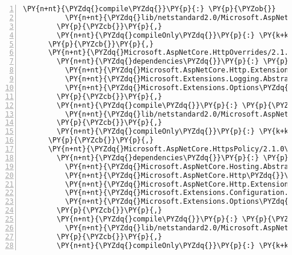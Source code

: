 \begin{Verbatim}[commandchars=\\\{\},numbers=left,firstnumber=1,stepnumber=1,numberblanklines=0]
        \PY{n+nt}{\PYZdq{}compile\PYZdq{}}\PY{p}{:} \PY{p}{\PYZob{}}
          \PY{n+nt}{\PYZdq{}lib/netstandard2.0/Microsoft.AspNetCore.Http.Features.dll\PYZdq{}}\PY{p}{:} \PY{p}{\PYZob{}}\PY{p}{\PYZcb{}}
        \PY{p}{\PYZcb{}}\PY{p}{,}
        \PY{n+nt}{\PYZdq{}compileOnly\PYZdq{}}\PY{p}{:} \PY{k+kc}{true}
      \PY{p}{\PYZcb{}}\PY{p}{,}
      \PY{n+nt}{\PYZdq{}Microsoft.AspNetCore.HttpOverrides/2.1.0\PYZhy{}rc1\PYZhy{}final\PYZdq{}}\PY{p}{:} \PY{p}{\PYZob{}}
        \PY{n+nt}{\PYZdq{}dependencies\PYZdq{}}\PY{p}{:} \PY{p}{\PYZob{}}
          \PY{n+nt}{\PYZdq{}Microsoft.AspNetCore.Http.Extensions\PYZdq{}}\PY{p}{:} \PY{l+s+s2}{\PYZdq{}2.1.0\PYZhy{}rc1\PYZhy{}final\PYZdq{}}\PY{p}{,}
          \PY{n+nt}{\PYZdq{}Microsoft.Extensions.Logging.Abstractions\PYZdq{}}\PY{p}{:} \PY{l+s+s2}{\PYZdq{}2.1.0\PYZhy{}rc1\PYZhy{}final\PYZdq{}}\PY{p}{,}
          \PY{n+nt}{\PYZdq{}Microsoft.Extensions.Options\PYZdq{}}\PY{p}{:} \PY{l+s+s2}{\PYZdq{}2.1.0\PYZhy{}rc1\PYZhy{}final\PYZdq{}}
        \PY{p}{\PYZcb{}}\PY{p}{,}
        \PY{n+nt}{\PYZdq{}compile\PYZdq{}}\PY{p}{:} \PY{p}{\PYZob{}}
          \PY{n+nt}{\PYZdq{}lib/netstandard2.0/Microsoft.AspNetCore.HttpOverrides.dll\PYZdq{}}\PY{p}{:} \PY{p}{\PYZob{}}\PY{p}{\PYZcb{}}
        \PY{p}{\PYZcb{}}\PY{p}{,}
        \PY{n+nt}{\PYZdq{}compileOnly\PYZdq{}}\PY{p}{:} \PY{k+kc}{true}
      \PY{p}{\PYZcb{}}\PY{p}{,}
      \PY{n+nt}{\PYZdq{}Microsoft.AspNetCore.HttpsPolicy/2.1.0\PYZhy{}rc1\PYZhy{}final\PYZdq{}}\PY{p}{:} \PY{p}{\PYZob{}}
        \PY{n+nt}{\PYZdq{}dependencies\PYZdq{}}\PY{p}{:} \PY{p}{\PYZob{}}
          \PY{n+nt}{\PYZdq{}Microsoft.AspNetCore.Hosting.Abstractions\PYZdq{}}\PY{p}{:} \PY{l+s+s2}{\PYZdq{}2.1.0\PYZhy{}rc1\PYZhy{}final\PYZdq{}}\PY{p}{,}
          \PY{n+nt}{\PYZdq{}Microsoft.AspNetCore.Http\PYZdq{}}\PY{p}{:} \PY{l+s+s2}{\PYZdq{}2.1.0\PYZhy{}rc1\PYZhy{}final\PYZdq{}}\PY{p}{,}
          \PY{n+nt}{\PYZdq{}Microsoft.AspNetCore.Http.Extensions\PYZdq{}}\PY{p}{:} \PY{l+s+s2}{\PYZdq{}2.1.0\PYZhy{}rc1\PYZhy{}final\PYZdq{}}\PY{p}{,}
          \PY{n+nt}{\PYZdq{}Microsoft.Extensions.Configuration.Binder\PYZdq{}}\PY{p}{:} \PY{l+s+s2}{\PYZdq{}2.1.0\PYZhy{}rc1\PYZhy{}final\PYZdq{}}\PY{p}{,}
          \PY{n+nt}{\PYZdq{}Microsoft.Extensions.Options\PYZdq{}}\PY{p}{:} \PY{l+s+s2}{\PYZdq{}2.1.0\PYZhy{}rc1\PYZhy{}final\PYZdq{}}
        \PY{p}{\PYZcb{}}\PY{p}{,}
        \PY{n+nt}{\PYZdq{}compile\PYZdq{}}\PY{p}{:} \PY{p}{\PYZob{}}
          \PY{n+nt}{\PYZdq{}lib/netstandard2.0/Microsoft.AspNetCore.HttpsPolicy.dll\PYZdq{}}\PY{p}{:} \PY{p}{\PYZob{}}\PY{p}{\PYZcb{}}
        \PY{p}{\PYZcb{}}\PY{p}{,}
        \PY{n+nt}{\PYZdq{}compileOnly\PYZdq{}}\PY{p}{:} \PY{k+kc}{true}

\end{Verbatim}
